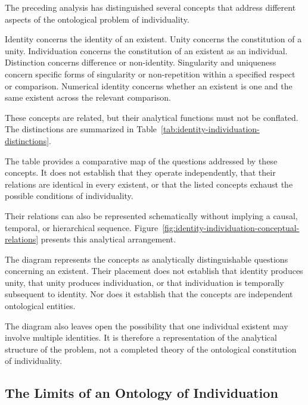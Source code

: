 The preceding analysis has distinguished several
concepts that address different aspects of the
ontological problem of individuality.

Identity concerns the identity of an existent.
Unity concerns the constitution of a unity.
Individuation concerns the constitution of an existent
as an individual. Distinction concerns difference or
non-identity. Singularity and uniqueness concern
specific forms of singularity or non-repetition within
a specified respect or comparison. Numerical identity
concerns whether an existent is one and the same
existent across the relevant comparison.

These concepts are related, but their analytical
functions must not be conflated. The distinctions
are summarized in Table~\ref{tab:identity-individuation-distinctions}.



The table provides a comparative map of the questions
addressed by these concepts. It does not establish that
they operate independently, that their relations are
identical in every existent, or that the listed concepts
exhaust the possible conditions of individuality.

Their relations can also be represented schematically
without implying a causal, temporal, or hierarchical
sequence. Figure~\ref{fig:identity-individuation-conceptual-relations}
presents this analytical arrangement.



The diagram represents the concepts as analytically
distinguishable questions concerning an existent.
Their placement does not establish that identity
produces unity, that unity produces individuation,
or that individuation is temporally subsequent to
identity. Nor does it establish that the concepts
are independent ontological entities.

The diagram also leaves open the possibility that
one individual existent may involve multiple identities.
It is therefore a representation of the analytical
structure of the problem, not a completed theory of
the ontological constitution of individuality.

\subsection{The Limits of an Ontology of Individuation}

